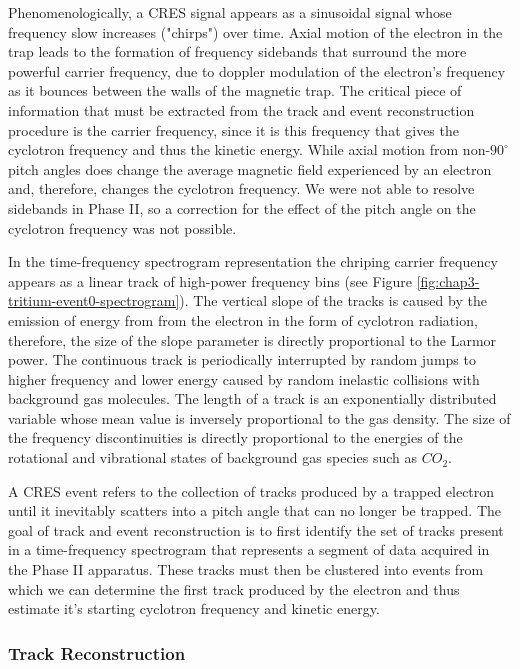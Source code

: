 Phenomenologically, a CRES signal appears as a sinusoidal signal whose frequency slow increases ("chirps") over time. Axial motion of the electron in the trap leads to the formation of frequency sidebands that surround the more powerful carrier frequency, due to doppler modulation of the electron's frequency as it bounces between the walls of the magnetic trap. The critical piece of information that must be extracted from the track and event reconstruction procedure is the carrier frequency, since it is this frequency that gives the cyclotron frequency and thus the kinetic energy. While axial motion from non-$90^\circ$ pitch angles does change the average magnetic field experienced by an electron and, therefore, changes the cyclotron frequency. We were not able to resolve sidebands in Phase II, so a correction for the effect of the pitch angle on the cyclotron frequency was not possible. 

In the time-frequency spectrogram representation the chriping carrier frequency appears as a linear track of high-power frequency bins (see Figure \ref{fig:chap3-tritium-event0-spectrogram}). The vertical slope of the tracks is caused by the emission of energy from from the electron in the form of cyclotron radiation, therefore, the size of the slope parameter is directly proportional to the Larmor power. The continuous track is periodically interrupted by random jumps to higher frequency and lower energy caused by random inelastic collisions with background gas molecules. The length of a track is an exponentially distributed variable whose mean value is inversely proportional to the gas density. The size of the frequency discontinuities is directly proportional to the energies of the rotational and vibrational states of background gas species such as $CO_2$. 

A CRES event refers to the collection of tracks produced by a trapped electron until it inevitably scatters into a pitch angle that can no longer be trapped. The goal of track and event reconstruction is to first identify the set of tracks present in a time-frequency spectrogram that represents a segment of data acquired in the Phase II apparatus. These tracks must then be clustered into events from which we can determine the first track produced by the electron and thus estimate it's starting cyclotron frequency and kinetic energy. 

\subsubsection*{Track Reconstruction}

